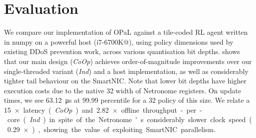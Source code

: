 \documentclass[
sigconf,natbib=false
]{acmart}
\newcommand{\approachshort}{OPaL}
\newcommand{\Coopfw}{\emph{CoOp}}
\newcommand{\coopfw}{\Coopfw}
\newcommand{\Indfw}{\emph{Ind}}
\newcommand{\indfw}{\Indfw}
\begin{document}
\section{Evaluation}
We compare our implementation of \approachshort{} against a tile-coded RL agent written in numpy on a powerful host (i7-6700K@), using policy dimensions used by existing DDoS prevention work\parencite{DBLP:journals/tnsm/SimpsonRP20}, across various quantisation bit depths.
 shows that our main design (\coopfw) achieves order-of-magnitude improvements over our single-threaded variant (\indfw) and a host implementation, as well as considerably tighter tail behaviour on the SmartNIC.
Note that lower bit depths have higher execution costs due to the native \qty{32}{\bit} width of Netronome registers.
On update times, we see \qty{63.12}{\micro\second} at 99.99 percentile for a \qty{32}{\bit} policy of this size.
We relate a \qty{15}{$\times$} latency (\coopfw) and \qty{2.82}{$\times$} offline throughput-per-core (\indfw) in spite of the Netronome's considerably slower clock speed (\qty{0.29}{$\times$}), showing the value of exploiting SmartNIC parallelism.
\end{document}
